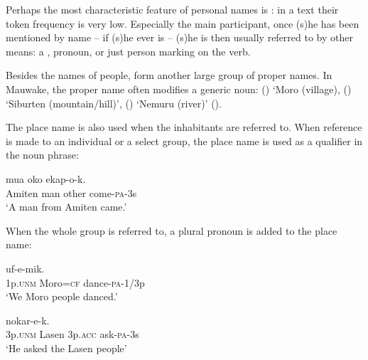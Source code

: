 Perhaps the most characteristic feature of personal names is : in a text their token frequency is very low. Especially the main participant, once (s)he has been mentioned by name -- if (s)he ever is -- (s)he is then usually referred to by other means: a , pronoun, or just person marking on the verb. 

Besides the names of people,  form another large group of proper names. In Mauwake, the proper name often modifies a generic noun:  () `Moro (village),  () `Siburten (mountain/hill)',  () `Nemuru (river)' (). 

The place name is also used when the inhabitants are referred to. When reference is made to an individual or a select group, the place name is used as a qualifier in the noun phrase: 

\ea%
\label{ex:3:x421}
\gll {}  mua oko ekap-o-k. \\
Amiten man other come-\textsc{pa}-3s\\
\glt`A man from Amiten came.'
\z

When the whole group is referred to, a plural pronoun is added to the place name:

\ea%
\label{ex:3:x422}
\gll {}  uf-e-mik. \\
1p.\textsc{unm} Moro=\textsc{cf} dance-\textsc{pa}-1/3p\\
\glt`We Moro people danced.'
\z

\ea%
\label{ex:3:x423}
\gll {}   nokar-e-k.\footnotemark{} \\
3p.\textsc{unm} Lasen 3p.\textsc{acc} ask-\textsc{pa}-3s\\
\glt`He asked the Lasen people'
\z


